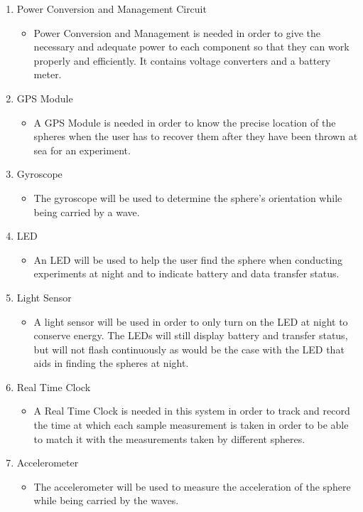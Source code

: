 \begin{enumerate}
\item Power Conversion and Management Circuit
	\begin{itemize}
		\item Power Conversion and Management is needed in order to give the necessary and adequate power to each component so that they can work properly and efficiently.  It contains voltage converters and a battery meter.
	\end{itemize}
\item GPS Module
\begin{itemize}
\item A GPS Module is needed in order to know the precise location of the spheres when the user has to recover them after they have been thrown at sea for an experiment.
\end{itemize}
\item Gyroscope
\begin{itemize}
\item The gyroscope will be used to determine the sphere's orientation while being carried by a wave.
\end{itemize}
\item LED
\begin{itemize}
\item An LED will be used to help the user find the sphere when conducting experiments at night and to indicate battery and data transfer status.
\end{itemize}
\item Light Sensor
\begin{itemize}
\item A light sensor will be used in order to only turn on the LED at night to conserve energy.  The LEDs will still display battery and transfer status, but will not flash continuously as would be the case with the LED that aids in finding the spheres at night.
\end{itemize}
\item Real Time Clock
\begin{itemize}
\item A Real Time Clock is needed in this system in order to track and record the time at which each sample measurement is taken in order to be able to match it with the measurements taken by different spheres.
\end{itemize}
\item Accelerometer
\begin{itemize}
\item The accelerometer will be used to measure the acceleration of the sphere while being carried by the waves.

\end{itemize}
\end{enumerate}
